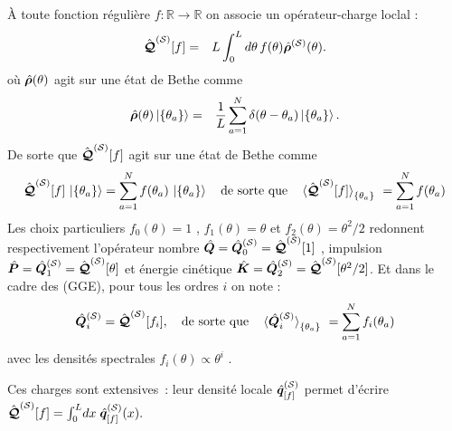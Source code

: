 À toute fonction régulière
\(
  f:\mathbb R\!\to\!\mathbb R
\)
on associe un opérateur-charge loclal :
\begin{eqnarray}\label{chap.2.charge.f.1}
	\hat{\bm{\mathcal{Q}}}^{(\mathcal{S})}[f] & = &  L \int_0^L d\theta \, f(\theta) \hat{\bm{\rho}}^{(\mathcal{S})}(\theta).	
\end{eqnarray}
où $\hat{\bm{\rho}}(\theta)$ agit sur une état de Bethe comme 
\begin{eqnarray}\label{chap.2.rho.1}
	 \hat{\bm{\rho}}(\theta) \ket{ \{ \theta_a \} } &=& \frac{1}{L} \sum_{a = 1 }^N  \delta ( \theta - \theta_a ) \ket{ \{ \theta_a \} }.	
\end{eqnarray}
De sorte que $\hat{\bm{\mathcal{Q}}}^{(\mathcal{S})}[f]$ agit sur une état de Bethe comme
\begin{eqnarray}\label{chap.2.charge.1}
	\operator{\mathcal{Q}}^{(\mathcal{S})}[f]\,\ket{\{\theta_a\} } =  \sum_{a=1}^{N}f(\theta_a)\,\ket{\{\theta_a\} } \quad \mbox{de sorte que} \quad \braket{\operator{\mathcal{Q}}^{(\mathcal{S})}[f]}_{\{\theta_a\}} = \sum_{a=1}^N f(\theta_a)
\end{eqnarray}
Les choix particuliers
\(
  f_0(\theta)=1
\)
,
\(
  f_1(\theta)=\theta
\)
et
\(
  f_2(\theta)=\theta^{2}/2
\)
redonnent respectivement l'opérateur nombre \(\hat{\bm{Q}}=\hat{\bm{Q}}_0^{(\mathcal{S})} = \hat{\bm{\mathcal{Q}}}^{(\mathcal{S})}[1]\) , impulsion \(\hat{\bm{P}}=\hat{\bm{Q}}_1^{(\mathcal{S})} = \hat{\bm{\mathcal{Q}}}^{(\mathcal{S})}[\theta]\) et énergie cinétique
\(\hat{\bm{K}}=\hat{\bm{Q}}_2^{(\mathcal{S})} = \hat{\bm{\mathcal{Q}}}^{(\mathcal{S})}[\theta^2/2]\). Et dans le cadre des (GGE), pour tous les ordres $i$ on note :
\begin{eqnarray}\label{chap.2.charge.ordre.i.1}
	\operator{Q}^{(\mathcal{S})}_i = \operator{\mathcal{Q}}^{(\mathcal{S})}[f_i]	, \quad \mbox{de sorte que} \quad \braket{\operator{Q}^{(\mathcal{S})}_i}_{\{\theta_a\}} = \sum_{a=1}^N f_i(\theta_a)  
\end{eqnarray}
avec les densités spectrales $f_i(\theta) \propto \theta^i$ . 

Ces charges sont extensives : leur densité locale $\hat{\bm{q}}^{(\mathcal{S})}_{[f]}$ permet d’écrire
\(
  \hat{\bm{\mathcal{Q}}}^{(\mathcal{S})}[f]=\int_0^{L}\!dx\;\hat{\bm{q}}^{(\mathcal{S})}_{[f]}(x).
\)

